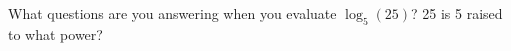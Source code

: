 {What questions are you answering when you evaluate $\log_5{(25)}$?}
{25 is 5 raised to what power?}
